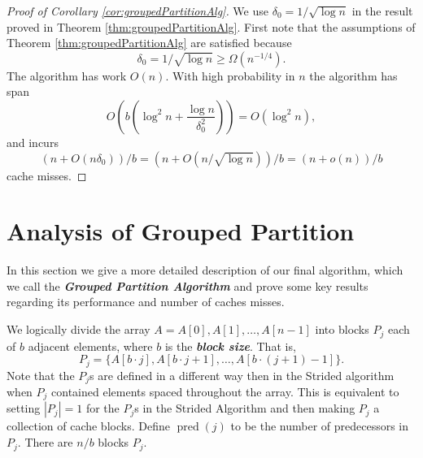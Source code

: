 \documentclass[twocolumn, twoside, 11pt]{article}
\def\pred{\operatorname{pred}}
\newcommand{\defn}[1]       {{\textit{\textbf{\boldmath #1}}}}
\renewcommand{\paragraph}[1]{\vspace{0.09in}\noindent{\bf \boldmath #1.}}
\begin{document}
\begin{proof}[Proof of Corollary \ref{cor:groupedPartitionAlg}]
	We use $\delta_0 = 1/\sqrt{\log n}$ in the result proved in Theorem \ref{thm:groupedPartitionAlg}.
	First note that the assumptions of Theorem \ref{thm:groupedPartitionAlg} are satisfied because 
	$$\delta_0=1/\sqrt{\log n} \ge \Omega(n^{-1/4}).$$
	The algorithm has work $O(n)$. 
	With high probability in $n$ the algorithm has span 
	$$O\left(b\left(\log^2 n + \frac{\log n}{\delta_0^2}\right)\right) =  O(\log^2 n),$$ 
	and incurs 
	$$(n+O(n\delta_0))/b = (n+O(n/\sqrt{\log n}))/b = (n+o(n))/b$$ 
	cache misses.
\end{proof}






\section{Analysis of Grouped Partition}
In this section we give a more detailed description of our final algorithm, which we call the \defn{Grouped Partition Algorithm} and prove some key results regarding its performance and number of caches misses. 

\paragraph{Algorithm Overview}
We logically divide the array $A = A[0],A[1],\ldots, A[n-1]$ into blocks $P_j$ each of $b$ adjacent elements, where $b$ is the \defn{block size}.
That is, 
$$P_j = \{A[b\cdot j], A[b\cdot j + 1], \ldots, A[b\cdot (j+1)-1]\}.$$
Note that the $P_j$s are defined in a different way then in the Strided algorithm when $P_j$ contained elements spaced throughout the array.
This is equivalent to setting $|P_j| = 1$ for the $P_j$s in the Strided Algorithm and then making $P_j$ a collection of cache blocks.
Define \defn{$\pred(j)$} to be the number of predecessors in $P_j$.
There are $n/b$ blocks $P_j$.
\end{document}
